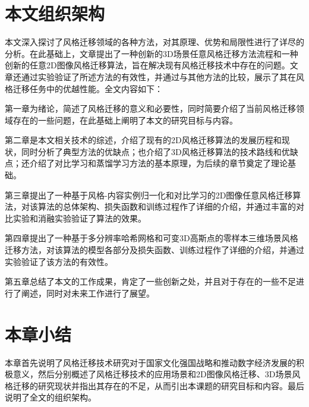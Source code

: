 \section{本文组织架构}
本文深入探讨了风格迁移领域的各种方法，对其原理、优势和局限性进行了详尽的分析。在此基础上，文章提出了一种创新的3D场景任意风格迁移方法流程和一种创新的任意2D图像风格迁移算法，旨在解决现有风格迁移技术中存在的问题。文章还通过实验验证了所述方法的有效性，并通过与其他方法的比较，展示了其在风格迁移任务中的优越性能。全文内容如下：
\par 第一章为绪论，简述了风格迁移的意义和必要性，同时简要介绍了当前风格迁移领域存在的一些问题，在此基础上阐明了本文的研究目标与内容。 
\par 第二章是本文相关技术的综述，介绍了现有的2D风格迁移算法的发展历程和现状，同时分析了典型方法的优缺点；也介绍了3D风格迁移算法的技术路线和优缺点；还介绍了对比学习和蒸馏学习方法的基本原理，为后续的章节奠定了理论基础。
\par 第三章提出了一种基于风格-内容实例归一化和对比学习的2D图像任意风格迁移算法，对该算法的总体架构、损失函数和训练过程作了详细的介绍，并通过丰富的对比实验和消融实验验证了算法的效果。
\par 第四章提出了一种基于多分辨率哈希网格和可变3D高斯点的零样本三维场景风格迁移方法，对该算法的模型各部分及损失函数、训练过程作了详细的介绍，并通过实验验证了该方法的有效性。
\par 第五章总结了本文的工作成果，肯定了一些创新之处，并且对于存在的一些不足进行了阐述，同时对未来工作进行了展望。

\section{本章小结}
本章首先说明了风格迁移技术研究对于国家文化强国战略和推动数字经济发展的积极意义，然后分别概述了风格迁移技术的应用场景和2D图像风格迁移、3D场景风格迁移的研究现状并指出其存在的不足，从而引出本课题的研究目标和内容。最后说明了全文的组织架构。  

